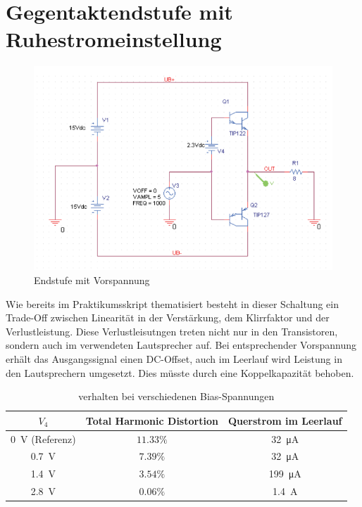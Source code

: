 \section{Gegentaktendstufe mit Ruhestromeinstellung}

\begin{figure}[H]
    \centering
    \includegraphics{tex/7_Leistungsverstaerker/pictures/Endstufe_Vorspannung_Schaltung.png}
    \caption{Endstufe mit Vorspannung}
    \label{fig:my_label}
\end{figure}

Wie bereits im Praktikumsskript thematisiert besteht in dieser Schaltung ein Trade-Off zwischen Linearität in der Verstärkung, dem Klirrfaktor und der Verlustleistung. Diese Verlustleisutngen treten nicht nur in den Transistoren, sondern auch im verwendeten Lautsprecher auf. Bei entsprechender Vorspannung erhält das Ausgangssignal einen DC-Offset, auch im Leerlauf wird Leistung in den Lautsprechern umgesetzt. Dies müsste durch eine Koppelkapazität behoben. 

\begin{table}[H]
    \centering
    \begin{tabular}{|c||c|c|}\hline
         $V_4$ & Total Harmonic Distortion & Querstrom im Leerlauf  \\ \hline \hline
         \SI{0}{\volt} (Referenz)& $11.33\%$ & \SI{32}{\micro \ampere} \\ \hline
         \SI{0.7}{\volt}& $7.39\%$ & \SI{32}{\micro \ampere} \\ \hline
         \SI{1.4}{\volt}& $3.54\%$ & \SI{199}{\micro \ampere} \\ \hline
         \SI{2.8}{\volt}& $0.06\%$ & \SI{1.4}{\ampere} \\ \hline
    \end{tabular} 
    \caption{verhalten bei verschiedenen Bias-Spannungen}
    \label{tab:my_label}
\end{table}

